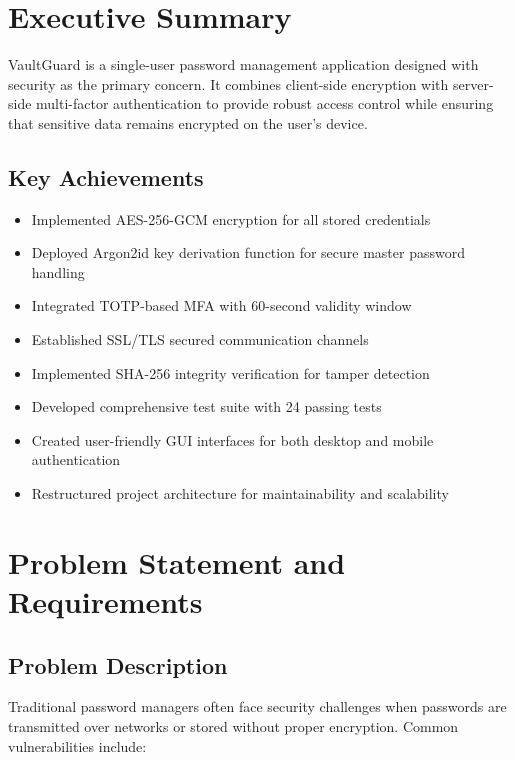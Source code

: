 \documentclass[12pt,a4paper]{report}
\begin{document}
\tableofcontents
\newpage

\chapter{Executive Summary}

VaultGuard is a single-user password management application designed with security as the primary concern. It combines client-side encryption with server-side multi-factor authentication to provide robust access control while ensuring that sensitive data remains encrypted on the user's device.

\section{Key Achievements}

\begin{itemize}
    \item Implemented AES-256-GCM encryption for all stored credentials
    \item Deployed Argon2id key derivation function for secure master password handling
    \item Integrated TOTP-based MFA with 60-second validity window
    \item Established SSL/TLS secured communication channels
    \item Implemented SHA-256 integrity verification for tamper detection
    \item Developed comprehensive test suite with 24 passing tests
    \item Created user-friendly GUI interfaces for both desktop and mobile authentication
    \item Restructured project architecture for maintainability and scalability
\end{itemize}

\chapter{Problem Statement and Requirements}

\section{Problem Description}

Traditional password managers often face security challenges when passwords are transmitted over networks or stored without proper encryption. Common vulnerabilities include:
\end{document}
